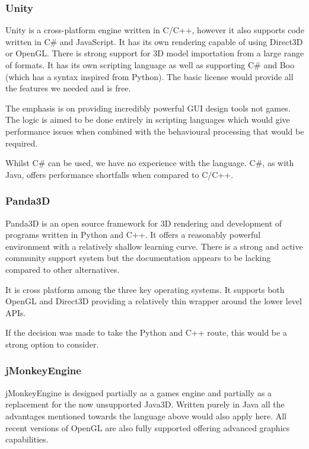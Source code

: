 \subsubsection{Unity}

Unity is a cross-platform engine written in C/C++, however it also
supports code written in C\# and JavaScript. It has its own rendering
capable of using Direct3D or OpenGL. There is strong support for 3D
model importation from a large range of formats. It has its own scripting
language as well as supporting C\# and Boo (which has a syntax inspired
from Python). The basic license would provide all the features we
needed and is free.

The emphasis is on providing incredibly powerful
GUI design tools not games. The logic is aimed to be done
entirely in scripting languages which would give performance issues
when combined with the behavioural processing that would be required.

Whilst C\# can be used, we have no experience with the language. C\#, as with
Java, offers performance shortfalls when compared to C/C++.


\subsubsection{Panda3D}

Panda3D is an open source framework for 3D rendering and development
of programs written in Python and C++. It offers a reasonably powerful
environment with a relatively shallow learning curve. There is a strong
and active community support system but the documentation appears
to be lacking compared to other alternatives.

It is cross platform among the three key operating systems.
It supports both OpenGL and Direct3D providing a relatively thin wrapper
around the lower level APIs.

If the decision was made to take the Python and C++ route, this would be a strong
option to consider.


\subsubsection{jMonkeyEngine}

jMonkeyEngine is designed partially as a games engine and partially as a
replacement for the now unsupported Java3D. Written purely in Java
all the advantages mentioned towards the language above would also
apply here. All recent versions of OpenGL are also fully supported
offering advanced graphics capabilities.

